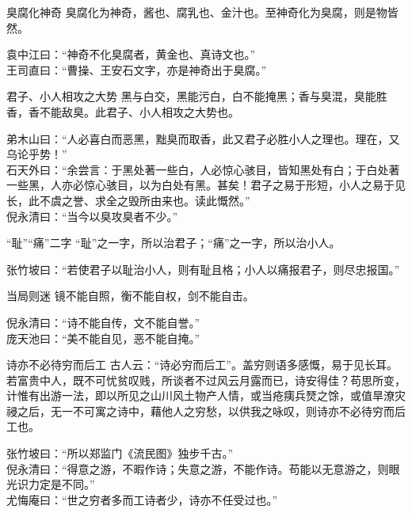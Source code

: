 \begin{yulu}{臭腐化神奇}
臭腐化为神奇，酱也、腐乳也、金汁也。至神奇化为臭腐，则是物皆然。
\begin{comments}
袁中江曰：“神奇不化臭腐者，黄金也、真诗文也。” \\
王司直曰：“曹操、王安石文字，亦是神奇出于臭腐。”
\end{comments}
\end{yulu}

\begin{yulu}{君子、小人相攻之大势}
黑与白交，黑能污白，白不能掩黑；香与臭混，臭能胜香，香不能敌臭。此君子、小人相攻之大势也。
\begin{comments}
弟木山曰：“人必喜白而恶黑，黜臭而取香，此又君子必胜小人之理也。理在，又乌论乎势！” \\
石天外曰：“余尝言：于黑处著一些白，人必惊心骇目，皆知黑处有白；于白处著一些黑，人亦必惊心骇目，以为白处有黑。甚矣！君子之易于形短，小人之易于见长，此不虞之誉、求全之毁所由来也。读此慨然。” \\
倪永清曰：“当今以臭攻臭者不少。”
\end{comments}
\end{yulu}

\begin{yulu}{“耻”“痛”二字}
“耻”之一字，所以治君子；“痛”之一字，所以治小人。
\begin{comments}
张竹坡曰：“若使君子以耻治小人，则有耻且格；小人以痛报君子，则尽忠报国。”
\end{comments}
\end{yulu}

\begin{yulu}{当局则迷}
镜不能自照，衡不能自权，剑不能自击。
\begin{comments}
倪永清曰：“诗不能自传，文不能自誉。” \\
庞天池曰：“美不能自见，恶不能自掩。”
\end{comments}
\end{yulu}

\begin{yulu}{诗亦不必待穷而后工}
古人云：“诗必穷而后工”。盖穷则语多感慨，易于见长耳。若富贵中人，既不可忧贫叹贱，所谈者不过风云月露而已，诗安得佳？苟思所变，计惟有出游一法，即以所见之山川风土物产人情，或当疮痍兵燹之馀，或值旱潦灾祲之后，无一不可寓之诗中，藉他人之穷愁，以供我之咏叹，则诗亦不必待穷而后工也。
\begin{comments}
张竹坡曰：“所以郑监门《流民图》独步千古。” \\
倪永清曰：“得意之游，不暇作诗；失意之游，不能作诗。苟能以无意游之，则眼光识力定是不同。” \\
尤悔庵曰：“世之穷者多而工诗者少，诗亦不任受过也。”
\end{comments}
\end{yulu}
